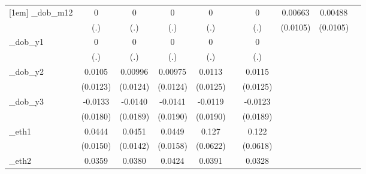 \begin{table}[htbp]
\begin{tabular}{l*{9}{c}}
[1em]
\_dob\_m12    &           0         &           0         &           0         &           0         &                     &           0         &     0.00663         &     0.00488         &                     \\
            &         (.)         &         (.)         &         (.)         &         (.)         &                     &         (.)         &    (0.0105)         &    (0.0105)         &                     \\
[1em]
\_dob\_y1     &           0         &           0         &           0         &           0         &                     &           0         &                     &                     &                     \\
            &         (.)         &         (.)         &         (.)         &         (.)         &                     &         (.)         &                     &                     &                     \\
[1em]
\_dob\_y2     &      0.0105         &     0.00996         &     0.00975         &      0.0113         &                     &      0.0115         &                     &                     &                     \\
            &    (0.0123)         &    (0.0124)         &    (0.0124)         &    (0.0125)         &                     &    (0.0125)         &                     &                     &                     \\
[1em]
\_dob\_y3     &     -0.0133         &     -0.0140         &     -0.0141         &     -0.0119         &                     &     -0.0123         &                     &                     &                     \\
            &    (0.0180)         &    (0.0189)         &    (0.0190)         &    (0.0190)         &                     &    (0.0189)         &                     &                     &                     \\
[1em]
\_eth1       &      0.0444\sym{***}&      0.0451\sym{***}&      0.0449\sym{***}&       0.127\sym{**} &                     &       0.122\sym{**} &                     &                     &                     \\
            &    (0.0150)         &    (0.0142)         &    (0.0158)         &    (0.0622)         &                     &    (0.0618)         &                     &                     &                     \\
[1em]
\_eth2       &      0.0359\sym{***}&      0.0380\sym{***}&      0.0424\sym{***}&      0.0391\sym{***}&                     &      0.0328\sym{***}&                     &                     &                     \\

\end{tabular}
\end{table}
